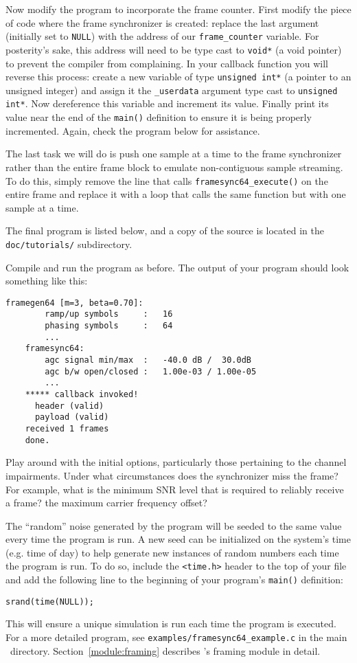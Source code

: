 Now modify the program to incorporate the frame counter.
First modify the piece of code where the frame synchronizer is created:
replace the last argument (initially set to {\tt NULL}) with the address
of our {\tt frame\_counter} variable.
For posterity's sake, this address will need to be type cast to
{\tt void*} (a void pointer) to prevent the compiler from complaining.
In your callback function you will reverse this process:
create a new variable of type {\tt unsigned int*}
(a pointer to an unsigned integer)
and assign it the {\tt \_userdata} argument type cast to
{\tt unsigned int*}.
Now dereference this variable and increment its value.
Finally print its value near the end of the {\tt main()} definition to
ensure it is being properly incremented.
Again, check the program below for assistance.

The last task we will do is push one sample at a time to the frame
synchronizer rather than the entire frame block to emulate
non-contiguous sample streaming.
To do this, simply remove the line that calls
{\tt framesync64\_execute()} on the entire frame
and replace it with a loop that calls the same function but with one
sample at a time.

The final program is listed below,
and a copy of the source is located in the {\tt doc/tutorials/}
subdirectory.
%

%
Compile and run the program as before.
The output of your program should look something like this:
%
\begin{Verbatim}[fontsize=\small]
    framegen64 [m=3, beta=0.70]:
        ramp/up symbols     :   16
        phasing symbols     :   64
        ...
    framesync64:
        agc signal min/max  :   -40.0 dB /  30.0dB
        agc b/w open/closed :   1.00e-03 / 1.00e-05
        ...
    ***** callback invoked!
      header (valid)
      payload (valid)
    received 1 frames
    done.
\end{Verbatim}
%
Play around with the initial options, particularly those pertaining to
the channel impairments.
Under what circumstances does the synchronizer miss the frame?
For example, what is the minimum SNR level that is required to reliably
receive a frame?
the maximum carrier frequency offset?

The ``random'' noise generated by the program will be seeded to the same
value every time the program is run.
A new seed can be initialized on the system's time (e.g. time of day) to
help generate new instances of random numbers each time the program is
run.
To do so, include the {\tt <time.h>} header to the top of your file and
add the following line to the beginning of your program's {\tt main()}
definition:
%
\begin{Verbatim}[fontsize=\small]
    srand(time(NULL));
\end{Verbatim}
%
This will ensure a unique simulation is run each time the program is
executed.
For a more detailed program, see {\tt examples/framesync64\_example.c}
in the main \liquid\ directory.
Section~\ref{module:framing} describes \liquid's framing module in
detail.


